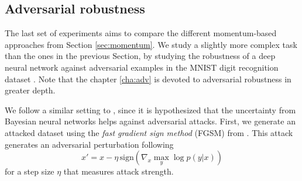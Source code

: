\begin{table}[H]
\caption{Root Mean Squared Error results for the BNN experiments}\label{tab:bnn2}
\end{table}

\subsection{Adversarial robustness}

The last set of experiments aims to compare the different momentum-based approaches from Section \ref{sec:momentum}. We study a slightly more complex task than the ones in the previous Section, by studying the robustness of a deep neural network against adversarial examples \cite{goodfellow2014explaining} in the MNIST digit recognition dataset \cite{MNIST}. Note that the chapter \ref{cha:adv} is devoted to adversarial robustness in greater depth.

We follow a similar setting to \cite{li2017dropout}, since it is hypothesized that the uncertainty from Bayesian neural networks helps against adversarial attacks. First, we generate an attacked dataset using the \emph{fast gradient sign method} (FGSM) from \cite{goodfellow2014explaining}. This attack generates an adversarial perturbation following
$$
x' = x - \eta\,\mbox{sign}(\nabla_x \max_y \log p(y|x))
$$
for a step size $\eta$ that measures attack strength.

